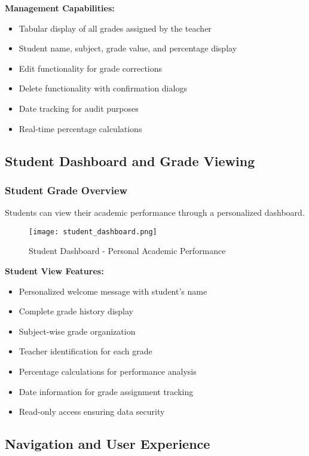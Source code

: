 \documentclass[12pt,a4paper]{article}
\begin{document}
\textbf{Management Capabilities:}
\begin{itemize}
    \item Tabular display of all grades assigned by the teacher
    \item Student name, subject, grade value, and percentage display
    \item Edit functionality for grade corrections
    \item Delete functionality with confirmation dialogs
    \item Date tracking for audit purposes
    \item Real-time percentage calculations
\end{itemize}

\subsection{Student Dashboard and Grade Viewing}

\subsubsection{Student Grade Overview}
Students can view their academic performance through a personalized dashboard.

\begin{figure}[h]
\centering
\texttt{[image: student\_dashboard.png]}
\caption{Student Dashboard - Personal Academic Performance}
\label{fig:student_dash}
\end{figure}

\textbf{Student View Features:}
\begin{itemize}
    \item Personalized welcome message with student's name
    \item Complete grade history display
    \item Subject-wise grade organization
    \item Teacher identification for each grade
    \item Percentage calculations for performance analysis
    \item Date information for grade assignment tracking
    \item Read-only access ensuring data security
\end{itemize}

\subsection{Navigation and User Experience}
\end{document}
